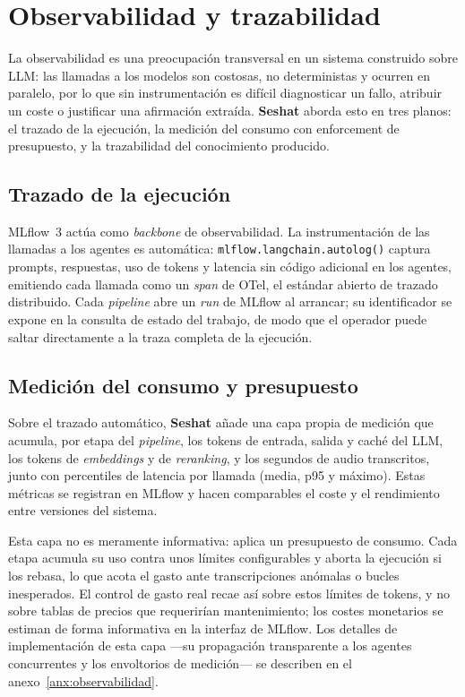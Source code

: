 \section{Observabilidad y trazabilidad}
\label{sec:observabilidad}

La observabilidad es una preocupación transversal en un sistema construido sobre \ac{LLM}: las
llamadas a los modelos son costosas, no deterministas y ocurren en paralelo, por lo que sin
instrumentación es difícil diagnosticar un fallo, atribuir un coste o justificar una afirmación
extraída. \textbf{Seshat} aborda esto en tres planos: el trazado de la ejecución, la medición del
consumo con enforcement de presupuesto, y la trazabilidad del conocimiento producido.

\subsection{Trazado de la ejecución}

MLflow~3 actúa como \textit{backbone} de observabilidad. La instrumentación de las llamadas a los
agentes es automática: \texttt{mlflow.langchain.autolog()} captura prompts, respuestas, uso de
tokens y latencia sin código adicional en los agentes, emitiendo cada llamada como un \textit{span}
de \ac{OTel}, el estándar abierto de trazado distribuido. Cada \textit{pipeline} abre un
\textit{run} de MLflow al arrancar; su identificador se
expone en la consulta de estado del trabajo, de modo que el operador puede saltar directamente a la
traza completa de la ejecución.

\subsection{Medición del consumo y presupuesto}

Sobre el trazado automático, \textbf{Seshat} añade una capa propia de medición que acumula, por
etapa del \textit{pipeline}, los tokens de entrada, salida y caché del LLM, los tokens de
\textit{embeddings} y de \textit{reranking}, y los segundos de audio transcritos, junto con
percentiles de latencia por llamada (media, p95 y máximo). Estas métricas se registran en MLflow y
hacen comparables el coste y el rendimiento entre versiones del sistema.

Esta capa no es meramente informativa: aplica un presupuesto de consumo. Cada etapa acumula su uso
contra unos límites configurables y aborta la ejecución si los rebasa, lo que acota el gasto ante
transcripciones anómalas o bucles inesperados. El control de gasto real recae así sobre estos
límites de tokens, y no sobre tablas de precios que requerirían mantenimiento; los costes
monetarios se estiman de forma informativa en la interfaz de MLflow. Los detalles de
implementación de esta capa —su propagación transparente a los agentes concurrentes y los
envoltorios de medición— se describen en el anexo~\ref{anx:observabilidad}.

